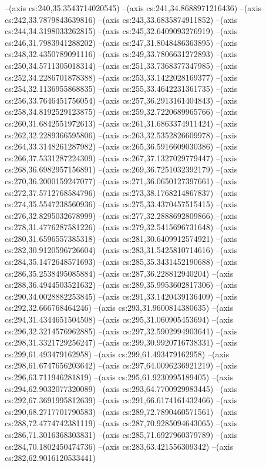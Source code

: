 --(axis cs:240,35.3543714020545)
--(axis cs:241,34.8688971216436)
--(axis cs:242,33.7879843639816)
--(axis cs:243,33.6835874911852)
--(axis cs:244,34.3198033262815)
--(axis cs:245,32.6409093276919)
--(axis cs:246,31.7983941288202)
--(axis cs:247,31.8048486363895)
--(axis cs:248,32.4350789091116)
--(axis cs:249,33.7806631272893)
--(axis cs:250,34.5711305018314)
--(axis cs:251,33.7368377347985)
--(axis cs:252,34.2286701878388)
--(axis cs:253,33.1422028169377)
--(axis cs:254,32.1136955868835)
--(axis cs:255,33.4642231361735)
--(axis cs:256,33.7646451756054)
--(axis cs:257,36.2913161404843)
--(axis cs:258,34.8192529123875)
--(axis cs:259,32.7220689965766)
--(axis cs:260,31.6842551972613)
--(axis cs:261,31.6863374911424)
--(axis cs:262,32.2289366595806)
--(axis cs:263,32.5352826609978)
--(axis cs:264,33.3148261287982)
--(axis cs:265,36.5916609030386)
--(axis cs:266,37.5331287224309)
--(axis cs:267,37.1327029779447)
--(axis cs:268,36.6982957156891)
--(axis cs:269,36.7251032392179)
--(axis cs:270,36.2000159247077)
--(axis cs:271,36.0650127397661)
--(axis cs:272,37.5712768584796)
--(axis cs:273,38.1768214867837)
--(axis cs:274,35.5547238560936)
--(axis cs:275,33.4370457515415)
--(axis cs:276,32.8295032678999)
--(axis cs:277,32.2888692809866)
--(axis cs:278,31.4776287581226)
--(axis cs:279,32.5415696731648)
--(axis cs:280,31.6596557385318)
--(axis cs:281,30.6409912574921)
--(axis cs:282,30.9120596726604)
--(axis cs:283,31.5425810714616)
--(axis cs:284,35.1472648571693)
--(axis cs:285,35.3431452190688)
--(axis cs:286,35.2538495085884)
--(axis cs:287,36.228812940204)
--(axis cs:288,36.4944503521632)
--(axis cs:289,35.9953602817306)
--(axis cs:290,34.0028882253845)
--(axis cs:291,33.1420439136409)
--(axis cs:292,32.666768464246)
--(axis cs:293,31.9600814380635)
--(axis cs:294,31.4344651504508)
--(axis cs:295,31.060905453694)
--(axis cs:296,32.3214576962885)
--(axis cs:297,32.5902994903641)
--(axis cs:298,31.3321729256247)
--(axis cs:299,30.9920716738331)
--(axis cs:299,61.493479162958)
--(axis cs:299,61.493479162958)
--(axis cs:298,61.6747656203642)
--(axis cs:297,64.0096236921219)
--(axis cs:296,63.711946281819)
--(axis cs:295,61.9230995189405)
--(axis cs:294,62.9032077320089)
--(axis cs:293,64.7700929983445)
--(axis cs:292,67.3691995812639)
--(axis cs:291,66.6174161432466)
--(axis cs:290,68.2717701790583)
--(axis cs:289,72.7890460571561)
--(axis cs:288,72.4774742381119)
--(axis cs:287,70.9285094643065)
--(axis cs:286,71.3016368303831)
--(axis cs:285,71.6927960379789)
--(axis cs:284,70.1802450474736)
--(axis cs:283,63.421556309342)
--(axis cs:282,62.9016120533441)
